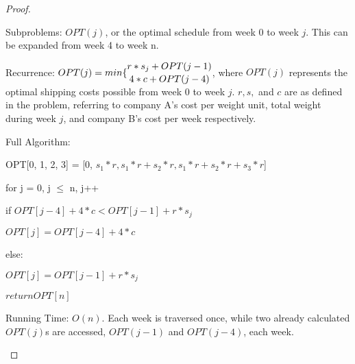 \documentclass[11pt, oneside]{article}
\begin{document}
\begin{proof}
\begin{description}

Subproblems: $OPT(j)$, or the optimal schedule from week 0 to week $j$. This can be expanded from week 4 to week n.

Recurrence: $OPT(j) = min \{\stackanchor{$r * s_j + OPT(j-1)$}{$4 * c + OPT(j-4)$}$, where $OPT(j)$ represents the optimal shipping costs possible from week 0 to week $j$. $r, s,$ and $c$ are as defined in the problem, referring to company A's cost per weight unit, total weight during week $j$, and company B's cost per week respectively.

Full Algorithm: 

OPT[0, 1, 2, 3] = [0, $s_1 * r, s_1*r + s_2 * r, s_1*r + s_2*r + s_3*r$]

for j = 0, j $\leq$ n, j++

	\quad if $OPT[j - 4] + 4*c < OPT[j-1] + r*s_j$

	\quad \quad 	$OPT[j] = OPT[j-4] + 4 * c$

	\quad else:

	\quad \quad  $OPT[j] = OPT[j-1] + r*s_j$

$return OPT[n]$

Running Time: $O(n)$. Each week is traversed once, while two already calculated $OPT(j)$s are accessed, $OPT(j-1)$ and $OPT(j-4)$, each week.

\end{description}
\end{proof}
\end{document}
